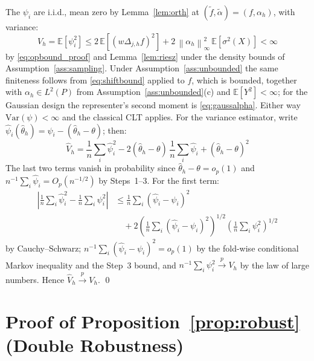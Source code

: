 \documentclass[12pt]{article}
\newcommand{\norm}[1]{\left\| #1 \right\|}
\newcommand{\E}{\mathbb{E}}
\newcommand{\xrightarrowp}{\xrightarrow{p}}
\newcommand{\abs}[1]{\left| #1 \right|}
\newcommand{\Dh}{\Delta_{j,h}}
\begin{document}
	The $\psi_i$ are i.i.d., mean zero by Lemma~\ref{lem:orth} at
	$(\tilde{f}, \tilde{\alpha}) = (f, \alpha_h)$, with variance:
	\begin{equation}
		V_h = \E[\psi_i^2]
		\leq 2\,\E\left[(w \Dh f)^2\right] + 2\,\norm{\alpha_h}_\infty^2\,
		\E[\sigma^2(X)] < \infty
	\end{equation}
	by \eqref{eq:opbound_proof} and Lemma~\ref{lem:riesz} under the density bounds of
	Assumption~\ref{ass:sampling}. Under Assumption~\ref{ass:unbounded} the same
	finiteness follows from \eqref{eq:shiftbound} applied to $f$, which is bounded,
	together with $\alpha_h \in L^2(P)$ from
	Assumption~\ref{ass:unbounded}(c) and $\E[Y^2] < \infty$; for the Gaussian design
	the representer's second moment is \eqref{eq:gaussalpha}. Either way
	$\mathrm{Var}(\psi) < \infty$ and the classical CLT applies. For the variance estimator, write
	$\hat{\psi}_i(\hat{\theta}_h) = \hat{\psi}_i - (\hat{\theta}_h - \theta)$; then:
	\begin{equation}
		\hat{V}_h = \frac{1}{n} \sum_i \hat{\psi}_i^2
		- 2(\hat{\theta}_h - \theta)\,\frac{1}{n}\sum_i \hat{\psi}_i
		+ (\hat{\theta}_h - \theta)^2
	\end{equation}
	The last two terms vanish in probability since
	$\hat{\theta}_h - \theta = o_p(1)$ and
	$n^{-1}\sum_i \hat{\psi}_i = O_p(n^{-1/2})$ by Steps~1--3. For the first term:
	\begin{equation}
		\begin{split}
			\abs{\frac{1}{n}\sum_i \hat{\psi}_i^2 - \frac{1}{n}\sum_i \psi_i^2}
			&\leq \frac{1}{n}\sum_i (\hat{\psi}_i - \psi_i)^2 \\
			&\quad + 2\left(\frac{1}{n}\sum_i (\hat{\psi}_i - \psi_i)^2\right)^{1/2}
			\left(\frac{1}{n}\sum_i \psi_i^2\right)^{1/2}
		\end{split}
	\end{equation}
	by Cauchy--Schwarz; $n^{-1}\sum_i (\hat{\psi}_i - \psi_i)^2 = o_p(1)$ by the
	fold-wise conditional Markov inequality and the Step~3 bound, and
	$n^{-1}\sum_i \psi_i^2 \xrightarrowp V_h$ by the law of large numbers. Hence
	$\hat{V}_h \xrightarrowp V_h$.
	\qed
	
	\section{Proof of Proposition~\ref{prop:robust} (Double Robustness)}
	\label{app:prop_robust}
	
\end{document}

